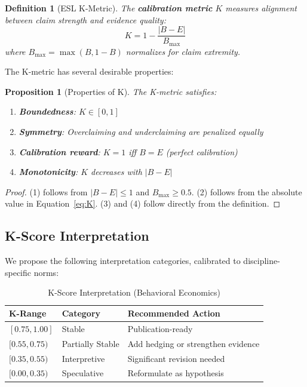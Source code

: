 \documentclass[11pt,a4paper]{article}
\newtheorem{definition}{Definition}
\newtheorem{proposition}{Proposition}
\begin{document}
\begin{definition}[ESL K-Metric]
The \textbf{calibration metric} $K$ measures alignment between claim
strength and evidence quality:
\begin{equation}
K = 1 - \frac{|B - E|}{B_{\max}}
\label{eq:K}
\end{equation}
where $B_{\max} = \max(B, 1-B)$ normalizes for claim extremity.
\end{definition}

The K-metric has several desirable properties:

\begin{proposition}[Properties of K]
The K-metric satisfies:
\begin{enumerate}
    \item \textbf{Boundedness}: $K \in [0, 1]$
    \item \textbf{Symmetry}: Overclaiming and underclaiming are penalized equally
    \item \textbf{Calibration reward}: $K = 1$ iff $B = E$ (perfect calibration)
    \item \textbf{Monotonicity}: $K$ decreases with $|B - E|$
\end{enumerate}
\end{proposition}

\begin{proof}
(1) follows from $|B - E| \leq 1$ and $B_{\max} \geq 0.5$.
(2) follows from the absolute value in Equation~\ref{eq:K}.
(3) and (4) follow directly from the definition.
\end{proof}

\subsection{K-Score Interpretation}

We propose the following interpretation categories, calibrated to
discipline-specific norms:

\begin{table}[h]
\centering
\caption{K-Score Interpretation (Behavioral Economics)}
\label{tab:K-interpretation}
\begin{tabular}{lll}
\toprule
\textbf{K-Range} & \textbf{Category} & \textbf{Recommended Action} \\
\midrule
$[0.75, 1.00]$ & Stable & Publication-ready \\
$[0.55, 0.75)$ & Partially Stable & Add hedging or strengthen evidence \\
$[0.35, 0.55)$ & Interpretive & Significant revision needed \\
$[0.00, 0.35)$ & Speculative & Reformulate as hypothesis \\
\bottomrule
\end{tabular}
\end{table}
\end{document}
